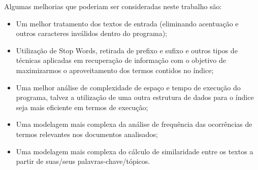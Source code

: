 \documentclass[12pt]{article}
\begin{document}
Algumas melhorias que poderiam ser consideradas neste trabalho são:
\begin{itemize}
\item Um melhor tratamento dos textos de entrada (eliminando acentuação e outros 
caracteres inválidos dentro do programa);
\item Utilização de Stop Words, retirada de prefixo e sufixo e outros tipos de técnicas
aplicadas em recuperação de informação com o objetivo de maximizarmos o aproveitamento dos
termos contidos no índice;
\item Uma melhor análise de complexidade de espaço e tempo de execução do programa, talvez
a utilização de uma outra estrutura de dados para o índice seja mais eficiente em termos 
de execução;
\item Uma modelagem mais complexa da análise de frequência das ocorrências de termos 
relevantes nos documentos analisados;
\item Uma modelagem mais complexa do cálculo de similaridade entre os textos a partir de 
suas/seus palavras-chave/tópicos.
\end{itemize}
\end{document}
